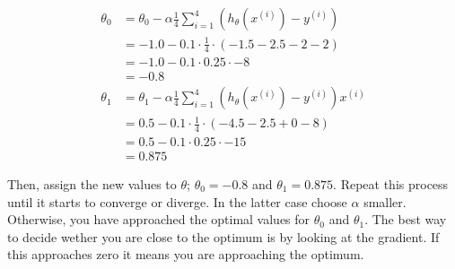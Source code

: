 \documentclass{article}
\begin{document}
\begin{align}
    \theta _0 &= \theta _0 - \alpha \frac{1}{4} \sum\limits_{i=1}^4 (h _{\theta} (x ^{(i)}) - y ^{(i)}) \\
    &= -1.0 - 0.1 \cdot \frac{1}{4} \cdot (-1.5 - 2.5 - 2 -2 )\\
    &= -1.0 - 0.1 \cdot  0.25 \cdot -8\\
    &= -0.8\\
    \theta _1 &= \theta _1 - \alpha \frac{1}{4} \sum\limits_{i=1}^4 (h _{\theta} (x ^{(i)}) - y ^{(i)})x^{(i)} \\
    &=0.5 - 0.1 \cdot \frac{1}{4} \cdot (-4.5 -2.5 + 0 - 8) \\
    &= 0.5 - 0.1 \cdot 0.25 \cdot -15 \\
    &=0.875
\end{align}

Then, assign the new values to $\theta$; $\theta _0 = -0.8$ and $\theta _1 = 0.875$. Repeat this process until it starts to converge or diverge. In the latter case choose $\alpha$ smaller. Otherwise, you have approached the optimal values for $\theta _0$  and $\theta _1$. The best way to decide wether you are close to the optimum is by looking at the gradient. If this approaches zero it means you are approaching the optimum.
\end{document}
